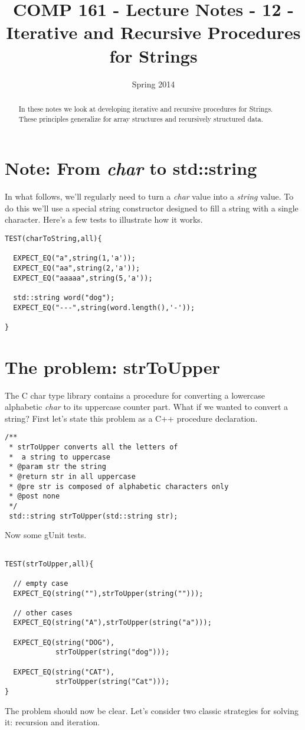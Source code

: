 \documentclass[]{tufte-handout}
\title{COMP 161 - Lecture Notes - 12 - Iterative and Recursive Procedures for Strings}
\date{Spring 2014}
\begin{document}
 
\maketitle

\begin{abstract}
In these notes we look at developing iterative and recursive procedures for Strings.  These principles generalize for array structures and recursively structured data. 
\end{abstract}

\section{Note: From \textit{char} to std::string}

In what follows, we'll regularly need to turn a \textit{char} value into a \textit{string} value.  To do this we'll use a special string constructor designed to fill a string with a single character. Here's a few tests to illustrate how it works.
\begin{verbatim}
TEST(charToString,all){

  EXPECT_EQ("a",string(1,'a'));
  EXPECT_EQ("aa",string(2,'a'));
  EXPECT_EQ("aaaaa",string(5,'a'));

  std::string word("dog");
  EXPECT_EQ("---",string(word.length(),'-')); 

}
\end{verbatim}

\section{The problem: strToUpper}

The C char type library contains a procedure for converting a lowercase alphabetic \textit{char} to its uppercase counter part. What if we wanted to convert a string?  First let's state this problem as a C++ procedure declaration.
\begin{verbatim}
/** 
 * strToUpper converts all the letters of 
 *  a string to uppercase
 * @param str the string
 * @return str in all uppercase
 * @pre str is composed of alphabetic characters only
 * @post none
 */
 std::string strToUpper(std::string str);
\end{verbatim}
Now some gUnit tests.
\begin{verbatim}

TEST(strToUpper,all){

  // empty case
  EXPECT_EQ(string(""),strToUpper(string("")));

  // other cases
  EXPECT_EQ(string("A"),strToUpper(string("a")));

  EXPECT_EQ(string("DOG"),
            strToUpper(string("dog")));
          
  EXPECT_EQ(string("CAT"),
            strToUpper(string("Cat")));
}
\end{verbatim}
The problem should now be clear.  Let's consider two classic strategies for solving it: recursion and iteration.
\end{document}
